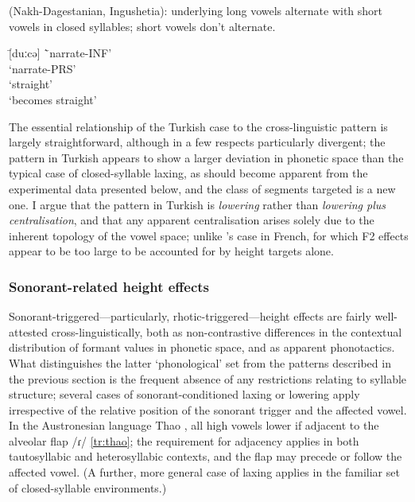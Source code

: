\begin{example} \label{tr:ingush}
   (Nakh-Dagestanian, Ingushetia): underlying long vowels alternate with short vowels in closed syllables; short vowels don't alternate. \citep{Nichols2011}
  \begin{tabbing}
   \tab[2cm] \= [duːcə] \tab[2cm] \= `narrate-{\sc\scriptsize INF}'\\
   \> [ducː] \> `narrate-{\sc\scriptsize PRS}'\\
   \> [niːsə] \> `straight'\\
   \> [nis.lu] \> `becomes straight'

    \end{tabbing}
\end{example}

The essential relationship of the Turkish case to the cross-linguistic pattern is largely straightforward, although in a few respects particularly divergent; the pattern in Turkish appears to show a larger deviation in phonetic space than the typical case of closed-syllable laxing, as should become apparent from the experimental data presented below, and the class of segments targeted is a new one. I argue that the pattern in Turkish is \emph{lowering} rather than \emph{lowering plus centralisation}, and that any apparent centralisation arises solely due to the inherent topology of the vowel space; unlike \citet[p.~95]{Storme2017PhD}'s case in French, for which F2 effects appear to be too large to be accounted for by height targets alone.

\subsubsection{Sonorant-related height effects}\label{sss:tr_son_effects}

Sonorant-triggered---particularly, rhotic-triggered---height effects are fairly well-attested cross-linguistically, both as non-contrastive differences in the contextual distribution of formant values in phonetic space, and as apparent phonotactics. What distinguishes the latter `phonological' set from the patterns described in the previous section is the frequent absence of any restrictions relating to syllable structure; several cases of sonorant-conditioned laxing or lowering apply irrespective of the relative position of the sonorant trigger and the affected vowel. In the Austronesian language Thao \citep[p.~264]{Blust2013}, all high vowels lower if adjacent to the alveolar flap /ɾ/ \cref{tr:thao}; the requirement for adjacency applies in both tautosyllabic and heterosyllabic contexts, and the flap may precede or follow the affected vowel. (A further, more general case of laxing applies in the familiar set of closed-syllable environments.)

